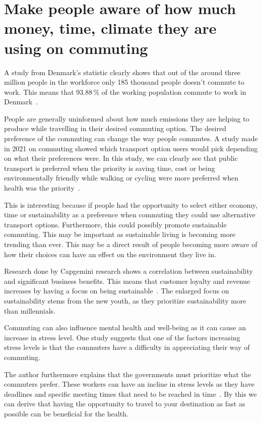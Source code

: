 \section{Make people aware of how much money, time, climate they are using on commuting}
\label{sec:make-people-aware-of-how-much-money-time-climate-they-are-using-on-commuting}

A study from Denmark’s statistic clearly shows that out of the around three million people in the workforce only
185 thousand people doesn't commute to work.
This means that \(93.88\,\%\) of the working population commute to work in Denmark~\cite{erhvervspendling2021}.

People are generally uninformed about how much emissions they are helping to produce while travelling in their
desired commuting option.
The desired preference of the commuting can change the way people commutes.
A study made in 2021 on commuting showed which transport option users would pick depending on what their preferences
were.
In this study, we can clearly see that public transport is preferred when the priority is saving time, cost or being
environmentally friendly while walking or cycling were more preferred when health was the priority~\cite{spark2023}.

This is interesting because if people had the opportunity to select either economy, time or sustainability as a
preference when commuting they could use alternative transport options.
Furthermore, this could possibly promote sustainable commuting.
This may be important as sustainable living is becoming more trending than ever.
This may be a direct result of people becoming more aware of how their choices can have an effect on the environment they
live in.

Research done by Capgemini research shows a correlation between sustainability and significant business benefits.
This means that customer loyalty and revenue increases by having a focus on being sustainable~\cite{capgemini2020}.
The enlarged focus on sustainability stems from the new youth, as they prioritize sustainability more than millennials.

Commuting can also influence mental health and well-being as it can cause an increase in stress level.
One study suggests that one of the factors increasing stress levels is that the commuters have a difficulty in
appreciating their way of commuting.

The author furthermore explains that the governments must prioritize what the commuters prefer.
These workers can have an incline in stress levels as they have deadlines and specific meeting times that need to be
reached in time~\cite{koslowsky2013}.
By this we can derive that having the opportunity to travel to your destination as fast as possible can be beneficial
for the health.

